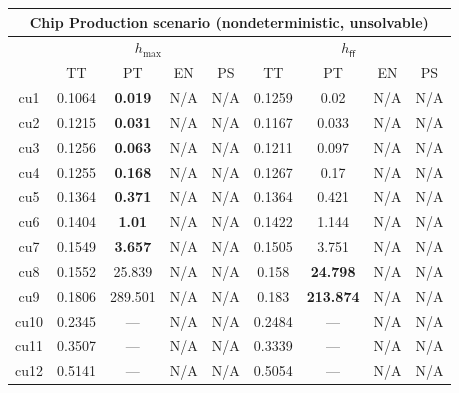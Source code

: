 \begin{tabular}{||c||c|c|c|c|c|c|c|c||}%
\multicolumn{9}{c}{\textbf{Chip Production scenario (nondeterministic, unsolvable)}}\\%
\hline%
&\multicolumn{4}{||c||}{$h_{\max}$}&\multicolumn{4}{||c||}{$h_{\mathsf{ff}}$}\\%
\hline%
&\small{TT}&\small{PT}&\small{EN}&\small{PS}&\small{TT}&\small{PT}&\small{EN}&\small{PS}\\%
\hline%
\hline%
cu1&\small{0.1064}&\small{\textbf{0.019}}&\small{N/A}&\small{N/A}&\small{0.1259}&\small{0.02}&\small{N/A}&\small{N/A}\\%
\hline%
cu2&\small{0.1215}&\small{\textbf{0.031}}&\small{N/A}&\small{N/A}&\small{0.1167}&\small{0.033}&\small{N/A}&\small{N/A}\\%
\hline%
cu3&\small{0.1256}&\small{\textbf{0.063}}&\small{N/A}&\small{N/A}&\small{0.1211}&\small{0.097}&\small{N/A}&\small{N/A}\\%
\hline%
cu4&\small{0.1255}&\small{\textbf{0.168}}&\small{N/A}&\small{N/A}&\small{0.1267}&\small{0.17}&\small{N/A}&\small{N/A}\\%
\hline%
cu5&\small{0.1364}&\small{\textbf{0.371}}&\small{N/A}&\small{N/A}&\small{0.1364}&\small{0.421}&\small{N/A}&\small{N/A}\\%
\hline%
cu6&\small{0.1404}&\small{\textbf{1.01}}&\small{N/A}&\small{N/A}&\small{0.1422}&\small{1.144}&\small{N/A}&\small{N/A}\\%
\hline%
cu7&\small{0.1549}&\small{\textbf{3.657}}&\small{N/A}&\small{N/A}&\small{0.1505}&\small{3.751}&\small{N/A}&\small{N/A}\\%
\hline%
cu8&\small{0.1552}&\small{25.839}&\small{N/A}&\small{N/A}&\small{0.158}&\small{\textbf{24.798}}&\small{N/A}&\small{N/A}\\%
\hline%
cu9&\small{0.1806}&\small{289.501}&\small{N/A}&\small{N/A}&\small{0.183}&\small{\textbf{213.874}}&\small{N/A}&\small{N/A}\\%
\hline%
cu10&\small{0.2345}&\small{---}&\small{N/A}&\small{N/A}&\small{0.2484}&\small{---}&\small{N/A}&\small{N/A}\\%
\hline%
cu11&\small{0.3507}&\small{---}&\small{N/A}&\small{N/A}&\small{0.3339}&\small{---}&\small{N/A}&\small{N/A}\\%
\hline%
cu12&\small{0.5141}&\small{---}&\small{N/A}&\small{N/A}&\small{0.5054}&\small{---}&\small{N/A}&\small{N/A}\\%
\hline%
\end{tabular}